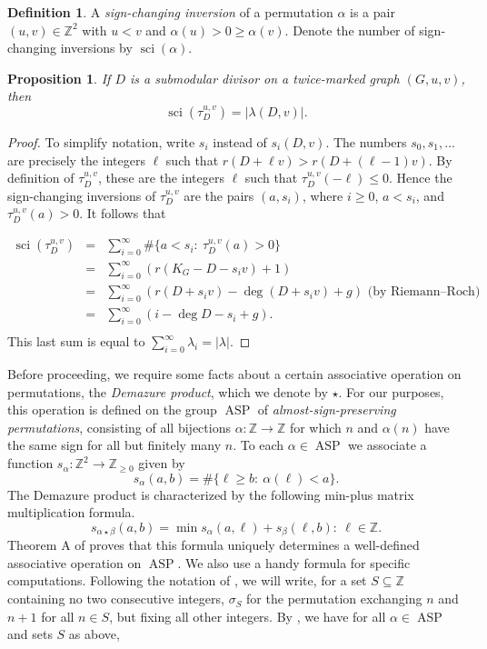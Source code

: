 \documentclass[11pt]{article}
\newtheorem{prop}[theo]{Proposition}
\theoremstyle{definition}
\newtheorem{defi}[theo]{Definition}
\numberwithin{equation}{section}
\newcommand{\Z}{\mathbb{Z}}
\newcommand{\tauD}{\tau^{u,v}_D}
\newcommand{\asp}{\operatorname{ASP}}
\newcommand{\sci}{\operatorname{sci}}
\begin{document}
\begin{defi}
A \emph{sign-changing inversion} of a permutation $\alpha$ is a pair $(u,v) \in \Z^2$ with $u<v$ and $\alpha(u) > 0 \geq \alpha(v)$. Denote the number of sign-changing inversions by $\sci(\alpha)$.
\end{defi}

\begin{prop}\label{prop:sciLambda}
If $D$ is a submodular divisor on a twice-marked graph $(G,u,v)$, then
$$\sci(\tauD) = \left| \lambda(D,v) \right|.$$
\end{prop}

\begin{proof}
To simplify notation, write $s_i$ instead of $s_i(D,v)$.
The numbers $s_0, s_1, \ldots$ are precisely the integers $\ell$ such that $r(D+\ell v) > r(D + (\ell-1)v)$. By definition of $\tauD$, these are the integers $\ell$ such that $\tauD(-\ell) \leq 0$. Hence the sign-changing inversions of $\tauD$ are the pairs $(a,s_i)$, where $i \geq 0$, $a < s_i$, and $\tauD(a) > 0$.
It follows that

\begin{eqnarray*}
\sci(\tauD) &=& \sum_{i=0}^\infty \# \{ a < s_i:\ \tauD(a) > 0 \}\\
&=& \sum_{i=0}^\infty \left( r(K_G - D - s_i v) + 1\right)\\
&=& \sum_{i=0}^\infty \left( r(D + s_i v) - \deg( D + s_i v) +g\right) \mbox{ (by Riemann--Roch)}\\
&=& \sum_{i=0}^\infty \left( i - \deg D - s_i + g \right).\\
\end{eqnarray*}
This last sum is equal to $\displaystyle \sum_{i=0}^\infty \lambda_i = |\lambda|$.
\end{proof}

Before proceeding, we require some facts about a certain associative operation on permutations, the \emph{Demazure product}, which we denote by $\star$. For our purposes, this operation is defined on the group $\asp$ of \emph{almost-sign-preserving permutations}, consisting of all bijections $\alpha: \Z \to \Z$ for which $n$ and $\alpha(n)$ have the same sign for all but finitely many $n$. To each $\alpha \in \asp$ we associate a function $s_\alpha: \Z^2 \to \Z_{\geq 0}$ given by
$$s_\alpha(a,b) = \# \{\ell \geq b:\ \alpha(\ell) < a\}.$$
The Demazure product is characterized by the following min-plus matrix multiplication formula.
$$s_{\alpha \star \beta}(a,b) = \min{
s_\alpha(a,\ell) + s_\beta(\ell,b):\ \ell \in \Z
}.$$
Theorem A of \cite{PflDemProd} proves that this formula uniquely determines a well-defined associative operation on $\asp$. We also use a handy formula for specific computations. Following the notation of \cite{PflDemProd}, we will write, for a set $S \subseteq \Z$ containing no two consecutive integers, $\sigma_S$ for the permutation exchanging $n$ and $n+1$ for all $n \in S$, but fixing all other integers. By \cite[Theorem 8.7]{PflDemProd}, we have for all $\alpha \in \asp$ and sets $S$ as above,
\end{document}
